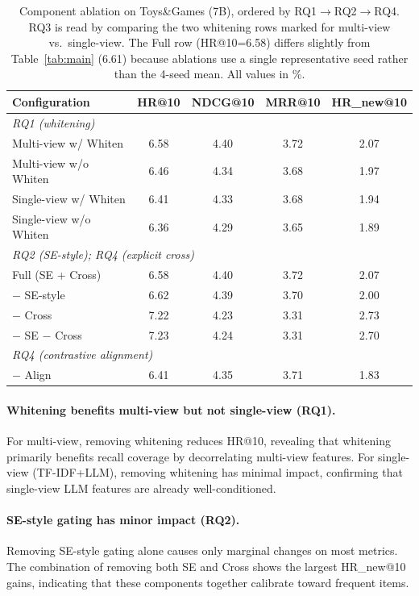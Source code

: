 \documentclass[sigconf,natbib=true,anonymous]{acmart}
\begin{document}
\begin{table}[t]
\caption{Component ablation on Toys\&Games (7B), ordered by RQ1$\rightarrow$RQ2$\rightarrow$RQ4.
RQ3 is read by comparing the two whitening rows marked for multi-view vs.\ single-view.
The Full row (HR@10=6.58) differs slightly from Table~\ref{tab:main} (6.61) because ablations use a single representative seed rather than the 4-seed mean.
All values in \%.}
\label{tab:ablation}
\centering
\scriptsize
\begin{tabular}{@{}lcccc@{}}
\toprule
\textbf{Configuration} & HR@10 & NDCG@10 & MRR@10 & HR\_new@10 \\
\midrule
\multicolumn{5}{l}{\textit{RQ1 (whitening)}} \\
Multi-view w/ Whiten & 6.58 & 4.40 & 3.72 & 2.07 \\
Multi-view w/o Whiten & 6.46 & 4.34 & 3.68 & 1.97 \\
Single-view w/ Whiten & 6.41 & 4.33 & 3.68 & 1.94 \\
Single-view w/o Whiten & 6.36 & 4.29 & 3.65 & 1.89 \\
\midrule
\multicolumn{5}{l}{\textit{RQ2 (SE-style); RQ4 (explicit cross)}} \\
Full (SE + Cross) & 6.58 & 4.40 & 3.72 & 2.07 \\
$-$ SE-style & 6.62 & 4.39 & 3.70 & 2.00 \\
$-$ Cross & 7.22 & 4.23 & 3.31 & 2.73 \\
$-$ SE $-$ Cross & 7.23 & 4.24 & 3.31 & 2.70 \\
\midrule
\multicolumn{5}{l}{\textit{RQ4 (contrastive alignment)}} \\
$-$ Align & 6.41 & 4.35 & 3.71 & 1.83 \\
\bottomrule
\end{tabular}
\end{table}

\paragraph{Whitening benefits multi-view but not single-view (RQ1).}
For multi-view, removing whitening reduces HR@10, revealing
that whitening primarily benefits recall coverage by decorrelating
multi-view features. For single-view (TF-IDF+LLM), removing
whitening has minimal impact, confirming that single-view LLM
features are already well-conditioned.

\paragraph{SE-style gating has minor impact (RQ2).}
Removing SE-style gating alone causes only marginal changes on
most metrics. The combination of removing both SE and Cross
shows the largest HR\_new@10 gains, indicating that these
components together calibrate toward frequent items.
\end{document}
